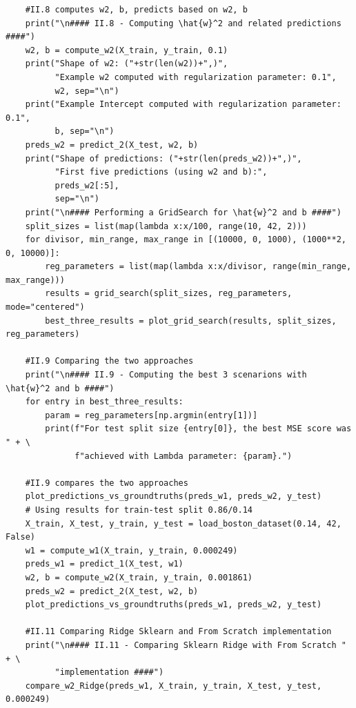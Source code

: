 \documentclass{homework}
\begin{document}
\begin{lstlisting}
    #II.8 computes w2, b, predicts based on w2, b
    print("\n#### II.8 - Computing \hat{w}^2 and related predictions ####")
    w2, b = compute_w2(X_train, y_train, 0.1)
    print("Shape of w2: ("+str(len(w2))+",)",
          "Example w2 computed with regularization parameter: 0.1",
          w2, sep="\n")
    print("Example Intercept computed with regularization parameter: 0.1",
          b, sep="\n")
    preds_w2 = predict_2(X_test, w2, b)
    print("Shape of predictions: ("+str(len(preds_w2))+",)",
          "First five predictions (using w2 and b):",
          preds_w2[:5],
          sep="\n")
    print("\n#### Performing a GridSearch for \hat{w}^2 and b ####")
    split_sizes = list(map(lambda x:x/100, range(10, 42, 2)))
    for divisor, min_range, max_range in [(10000, 0, 1000), (1000**2, 0, 10000)]:
        reg_parameters = list(map(lambda x:x/divisor, range(min_range, max_range)))
        results = grid_search(split_sizes, reg_parameters, mode="centered")
        best_three_results = plot_grid_search(results, split_sizes, reg_parameters)

    #II.9 Comparing the two approaches
    print("\n#### II.9 - Computing the best 3 scenarions with \hat{w}^2 and b ####")
    for entry in best_three_results:
        param = reg_parameters[np.argmin(entry[1])]
        print(f"For test split size {entry[0]}, the best MSE score was " + \
              f"achieved with Lambda parameter: {param}.")

    #II.9 compares the two approaches
    plot_predictions_vs_groundtruths(preds_w1, preds_w2, y_test)
    # Using results for train-test split 0.86/0.14
    X_train, X_test, y_train, y_test = load_boston_dataset(0.14, 42, False)
    w1 = compute_w1(X_train, y_train, 0.000249)
    preds_w1 = predict_1(X_test, w1)
    w2, b = compute_w2(X_train, y_train, 0.001861)
    preds_w2 = predict_2(X_test, w2, b)
    plot_predictions_vs_groundtruths(preds_w1, preds_w2, y_test)

    #II.11 Comparing Ridge Sklearn and From Scratch implementation
    print("\n#### II.11 - Comparing Sklearn Ridge with From Scratch " + \
          "implementation ####")
    compare_w2_Ridge(preds_w1, X_train, y_train, X_test, y_test, 0.000249)
\end{lstlisting}
\end{document}
